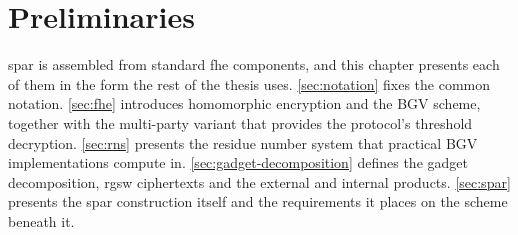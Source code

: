 \chapter{Preliminaries}
\label{chp:protocol}

\vfill
\gls{spar} is assembled from standard \gls{fhe} components, and this chapter presents each of them in the form the rest of the thesis uses. \autoref{sec:notation} fixes the common notation. \autoref{sec:fhe} introduces homomorphic encryption and the BGV scheme, together with the multi-party variant that provides the protocol's threshold decryption. \autoref{sec:rns} presents the residue number system that practical BGV implementations compute in. \autoref{sec:gadget-decomposition} defines the gadget decomposition, \gls{rgsw} ciphertexts and the external and internal products. \autoref{sec:spar} presents the \gls{spar} construction itself and the requirements it places on the scheme beneath it.
\newpage

\newcommand{\gadgetformat}[2]{{#1}_{\mathsf{#2}}}
\newcommand{\behz}[1]{\gadgetformat{#1}{BEHZ}}
\newcommand{\hps}[1]{\gadgetformat{#1}{HPS}}
\newcommand{\bv}[1]{\gadgetformat{#1}{BV}}

\newpage
\newpage
\newpage
\newpage 
\newpage